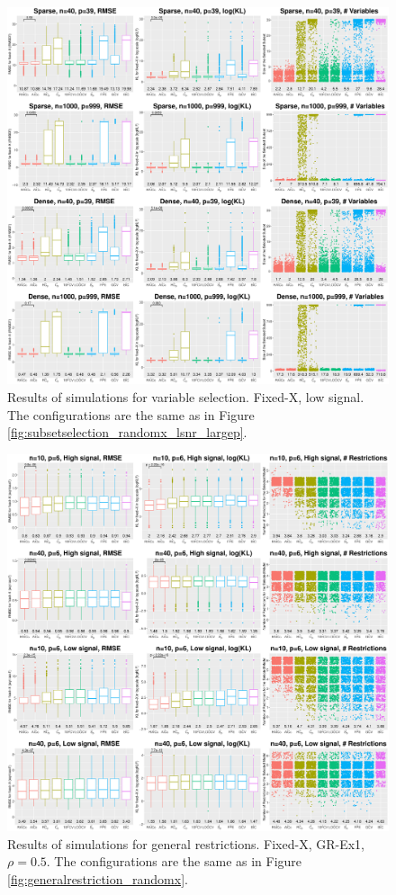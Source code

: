 \begin{figure}[!ht]
  \centering
  \includegraphics[width=\textwidth]{figures/main/fixedx_VS_lsnr.eps}
  \caption{Results of simulations for variable selection. Fixed-X, low signal. The configurations are the same as in Figure \ref{fig:subsetselection_randomx_lsnr_largep}.}
  \label{fig:subsetselection_fixedx_lsnr_largep}
\end{figure}

\begin{figure}[!ht]
  \centering
  \includegraphics[width=\textwidth]{figures/main/fixedx_GR-Ex1.eps}
  \caption{Results of simulations for general restrictions. Fixed-X, GR-Ex1, $\rho=0.5$. The configurations are the same as in Figure \ref{fig:generalrestriction_randomx}.}
  \label{fig:generalrestriction_fixedx}
\end{figure}

